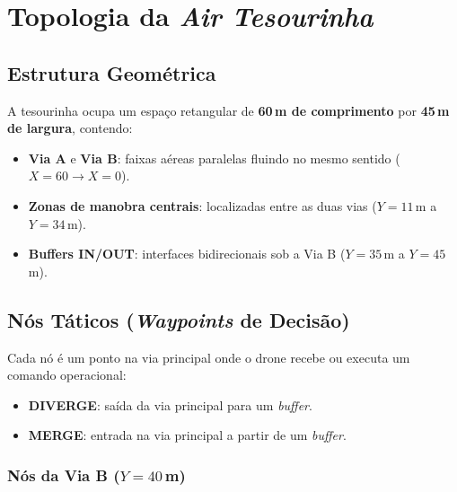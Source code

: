\documentclass[12pt,a4paper]{article}
\begin{document}
\section{Topologia da \textit{Air Tesourinha}}

\subsection{Estrutura Geométrica}

A tesourinha ocupa um espaço retangular de \textbf{60\,m de comprimento} por \textbf{45\,m de largura}, contendo:

\begin{itemize}
    \item \textbf{Via A} e \textbf{Via B}: faixas aéreas paralelas fluindo no mesmo sentido ($X = 60 \to X = 0$).
    \item \textbf{Zonas de manobra centrais}: localizadas entre as duas vias ($Y = 11$\,m a $Y = 34$\,m).
    \item \textbf{Buffers IN/OUT}: interfaces bidirecionais sob a Via B ($Y = 35$\,m a $Y = 45$\,m).
\end{itemize}

\subsection{Nós Táticos (\textit{Waypoints} de Decisão)}

Cada nó é um ponto na via principal onde o drone recebe ou executa um comando operacional:

\begin{itemize}
    \item \textbf{DIVERGE}: saída da via principal para um \textit{buffer}.
    \item \textbf{MERGE}: entrada na via principal a partir de um \textit{buffer}.
\end{itemize}

\subsubsection{Nós da Via B ($Y = 40$\,m)}
\end{document}
